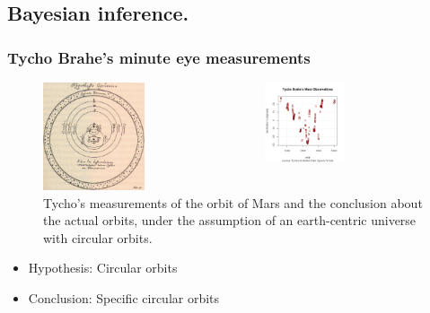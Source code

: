 \subsection{Bayesian inference.}
\begin{frame}
  \frametitle{Tycho Brahe's minute eye measurements}
  \begin{figure}[H]
    \centering
    \begin{columns}
      \begin{column}{0.5\textwidth}
        \includegraphics[width=0.5\textwidth]{../figures/circular-orbits}
      \end{column}
      \begin{column}{0.5\textwidth}
        \includegraphics[width=0.5\textwidth]{../figures/tycho-observations}
      \end{column}
    \end{columns}
    
    \caption{Tycho's measurements of the orbit of Mars and the conclusion about the actual orbits, under the assumption of an earth-centric universe with circular orbits.}
    \label{fig:tycho}
  \end{figure}
    \begin{itemize}
    \item Hypothesis: Circular orbits
    \item Conclusion: \alert{Specific} circular orbits
    \end{itemize}
  \end{frame}


